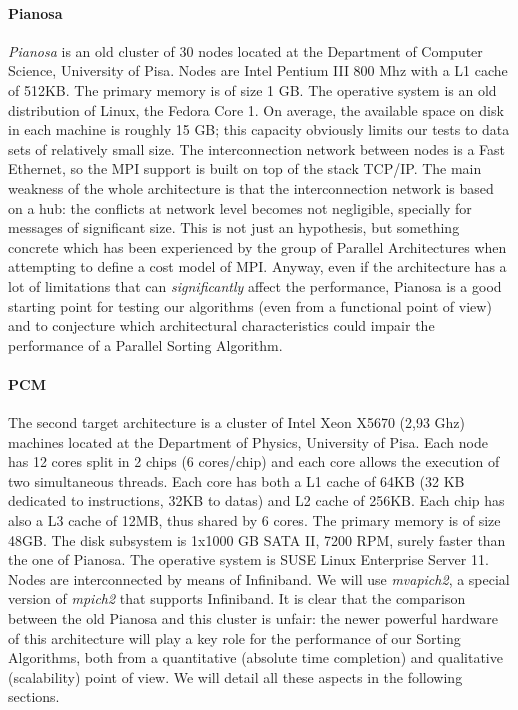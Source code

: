 \paragraph{Pianosa}
\textit{Pianosa} is an old cluster of 30 nodes located at the Department of Computer Science, University of Pisa. Nodes are Intel Pentium III 800 Mhz with a L1 cache of 512KB. The primary memory is of size 1 GB. The operative system is an old distribution of Linux, the Fedora Core 1. On average, the available space on disk in each machine is roughly 15 GB; this capacity obviously limits our tests to data sets of relatively small size. The interconnection network between nodes is a Fast Ethernet, so the MPI support is built on top of the stack TCP/IP. The main weakness of the whole architecture is that the interconnection network is based on a hub: the conflicts at network level becomes not negligible, specially for messages of significant size. This is not just an hypothesis, but something concrete which has been experienced by the group of Parallel Architectures when attempting to define a cost model of MPI. Anyway, even if the architecture has a lot of limitations that can \textit{significantly} affect the performance, Pianosa is a good starting point for testing our algorithms (even from a functional point of view) and to conjecture which architectural characteristics could impair the performance of a Parallel Sorting Algorithm.

\paragraph{PCM}
\label{PCM}
The second target architecture is a cluster of Intel Xeon X5670 (2,93 Ghz) machines located at the Department of Physics, University of Pisa. Each node has 12 cores split in 2 chips (6 cores/chip) and each core allows the execution of two simultaneous threads. Each core has both a L1 cache of 64KB (32 KB dedicated to instructions, 32KB to datas) and L2 cache of 256KB. Each chip has also a L3 cache of 12MB, thus shared by 6 cores. The primary memory is of size 48GB. The disk subsystem is 1x1000 GB SATA II, 7200 RPM, surely faster than the one of Pianosa. The operative system is SUSE Linux Enterprise Server 11. Nodes are interconnected by means of Infiniband. We will use \textit{mvapich2}, a special version of \textit{mpich2} that supports Infiniband. It is clear that the comparison between the old Pianosa and this cluster is unfair: the newer powerful hardware of this architecture will play a key role for the performance of our Sorting Algorithms, both from a quantitative (absolute time completion) and qualitative (scalability) point of view. We will detail all these aspects in the following sections.

